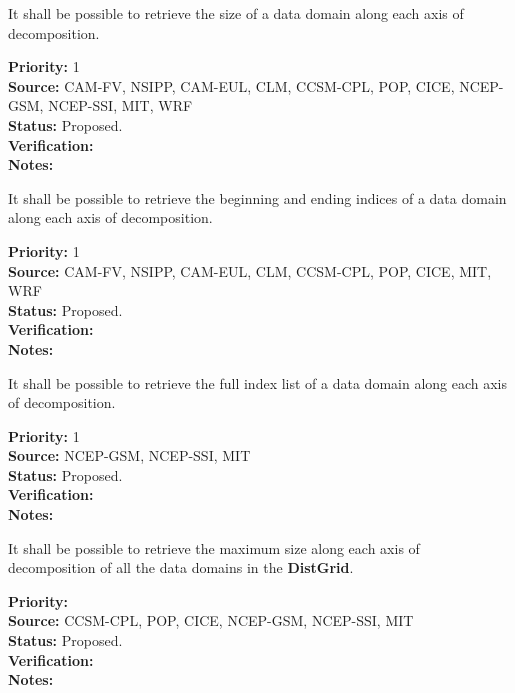 

It shall be possible to retrieve the size of a data domain
along each axis of decomposition.

\begin{reqlist}
{\bf Priority:} 1 \\ 
{\bf Source:} CAM-FV, NSIPP, CAM-EUL, CLM, CCSM-CPL, POP, CICE, NCEP-GSM, NCEP-SSI, MIT, WRF \\
{\bf Status:} Proposed. \\
{\bf Verification:} \\
{\bf Notes:}
\end{reqlist}


It shall be possible to retrieve the beginning and ending indices of a
data domain along each axis of decomposition.

\begin{reqlist}
{\bf Priority:} 1 \\
{\bf Source:} CAM-FV, NSIPP, CAM-EUL, CLM, CCSM-CPL, POP, CICE, MIT, WRF \\
{\bf Status:} Proposed. \\
{\bf Verification:} \\
{\bf Notes:}
\end{reqlist}


It shall be possible to retrieve the full index list of a
data domain along each axis of decomposition.

\begin{reqlist}
{\bf Priority:} 1 \\ 
{\bf Source:} NCEP-GSM, NCEP-SSI, MIT \\
{\bf Status:} Proposed. \\
{\bf Verification:} \\
{\bf Notes:}
\end{reqlist}


It shall be possible to retrieve the maximum size along each axis of
decomposition of all the data domains in the \textbf{DistGrid}. 

\begin{reqlist}
{\bf Priority:} \\
{\bf Source:} CCSM-CPL, POP, CICE, NCEP-GSM, NCEP-SSI, MIT \\
{\bf Status:} Proposed. \\
{\bf Verification:} \\
{\bf Notes:}
\end{reqlist}

